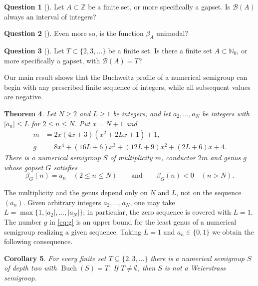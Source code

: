 \documentclass[11pt]{amsart}
\newtheorem{theorem}{Theorem}[section]
\newtheorem{corollary}[theorem]{Corollary}
\theoremstyle{definition}
\newtheorem{question}[theorem]{Question}
\theoremstyle{remark}
\numberwithin{equation}{section}
\newcommand{\NN}{\mathbb{N}_0}
\newcommand{\B}{\mathcal{B}}
\newcommand{\Buch}{\operatorname{Buch}}
\begin{document}
\begin{question}[{\cite[Question~4.1]{EGMV23}}]\label{q:interval}
Let $A\subset\mathbb{Z}$ be a finite set, or more specifically a gapset. Is $\B(A)$ always an interval of integers?
\end{question}

\begin{question}[{\cite[Question~4.2]{EGMV23}}]\label{q:unimodal}
Even more so, is the function $\beta_A$ unimodal?
\end{question}

\begin{question}[{\cite[Question~4.3]{EGMV23}}]\label{q:finite}
Let $T\subset\{2,3,\dots\}$ be a finite set. Is there a finite set $A\subset\NN$, or more specifically a gapset, with $\B(A)=T$?
\end{question}

Our main result shows that the Buchweitz profile of a numerical semigroup can begin with any prescribed finite sequence of integers, while all subsequent values are negative.

\begin{theorem}\label{thm:main}
Let $N\ge 2$ and $L\ge 1$ be integers, and let $a_2,\dots,a_N$ be integers with $|a_n|\le L$ for $2\le n\le N$. Put $x=N+1$ and
\begin{align}
m&=2x(4x+3)(x^2+2Lx+1)+1,\label{eq:m}\\
g&=8x^4+(16L+6)x^3+(12L+9)x^2+(2L+6)x+4.\label{eq:g}
\end{align}
There is a numerical semigroup $S$ of multiplicity $m$, conductor $2m$ and genus $g$ whose gapset $G$ satisfies
\[
\beta_G(n)=a_n\quad (2\le n\le N)\qquad\text{and}\qquad \beta_G(n)<0\quad (n>N).
\]
\end{theorem}

The multiplicity and the genus depend only on $N$ and $L$, not on the sequence $(a_n)$. Given arbitrary integers $a_2,\dots,a_N$, one may take $L=\max\{1,|a_2|,\dots,|a_N|\}$; in particular, the zero sequence is covered with $L=1$. The number $g$ in \eqref{eq:g} is an upper bound for the least genus of a numerical semigroup realizing a given sequence. Taking $L=1$ and $a_n\in\{0,1\}$ we obtain the following consequence.

\begin{corollary}\label{cor:sets}
For every finite set $T\subseteq\{2,3,\dots\}$ there is a numerical semigroup $S$ of depth two with $\Buch(S)=T$. If $T\neq\emptyset$, then $S$ is not a Weierstrass semigroup.
\end{corollary}
\end{document}
